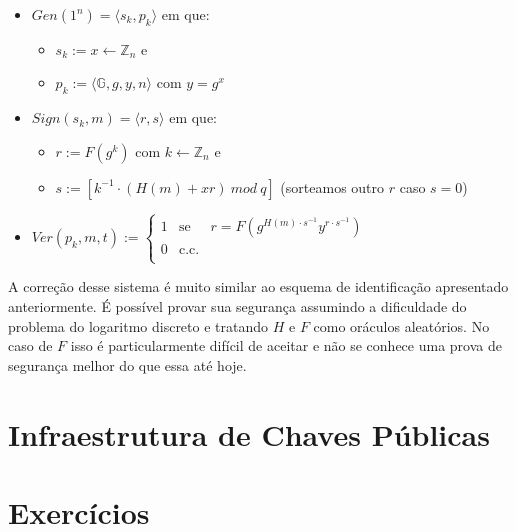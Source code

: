 \begin{itemize}
\item $Gen(1^n) = \langle s_k, p_k \rangle$ em que:
\begin{itemize}
\item $s_k := x \leftarrow \mathbb{Z}_n$ e
\item $p_k := \langle \mathbb{G}, g, y, n \rangle$ com $y = g^x$
\end{itemize}
\item $Sign(s_k, m) = \langle r, s \rangle$ em que:
  \begin{itemize}
  \item $r := F(g^k)$ com $k \leftarrow \mathbb{Z}_n$ e
  \item $s := [k^{-1} \cdot (H(m) + xr)\ mod\ q]$ (sorteamos outro $r$ caso $s = 0$)
  \end{itemize}
\item $Ver(p_k, m, t) := \left\{
    \begin{array}{lcl}
      1 & \textrm{se} & r = F(g^{H(m) \cdot s^{-1}} y^{r \cdot s^{-1}})\\
      0 & \textrm{c.c.} &\\
    \end{array}
    \right.$
\end{itemize}

A correção desse sistema é muito similar ao esquema de identificação apresentado anteriormente.
É possível provar sua segurança assumindo a dificuldade do problema do logaritmo discreto e tratando $H$ e $F$ como oráculos aleatórios.
No caso de $F$ isso é particularmente difícil de aceitar e não se conhece uma prova de segurança melhor do que essa até hoje.

\section{Infraestrutura de Chaves Públicas}
\label{sec:pki}


\section{Exercícios}
\label{sec:exercicios}




